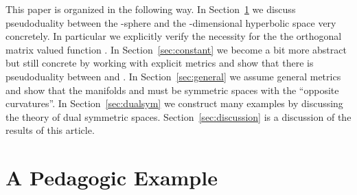 \documentclass[a4paper,12pt]{article}
\providecommand{\Mtil}{\widetilde{M}}
\begin{document}
This paper is organized in the following way.  In
Section~\ref{sec:pedagogic} we discuss pseudoduality between the
\coordHE{}-sphere \coordHE{} and the \coordHE{}-dimensional hyperbolic space \coordHE{} very
concretely.  In particular we explicitly verify the necessity for the
the orthogonal matrix valued function \coordHE{}.  In
Section~\ref{sec:constant} we become a bit more abstract but still
concrete by working with explicit metrics and show that there is
pseudoduality  between \coordHE{} and \coordHE{}.  In
Section~\ref{sec:general} we assume general metrics and show that the
manifolds \coordHE{} and \myHighlight{$\Mtil$}\coordHE{} must be symmetric spaces with the ``opposite
curvatures''.  In Section~\ref{sec:dualsym} we construct many examples
by discussing the theory of dual symmetric spaces. 
Section~\ref{sec:discussion} is a discussion of the results of this
article.

\section{A Pedagogic Example}
\label{sec:pedagogic}
\end{document}
